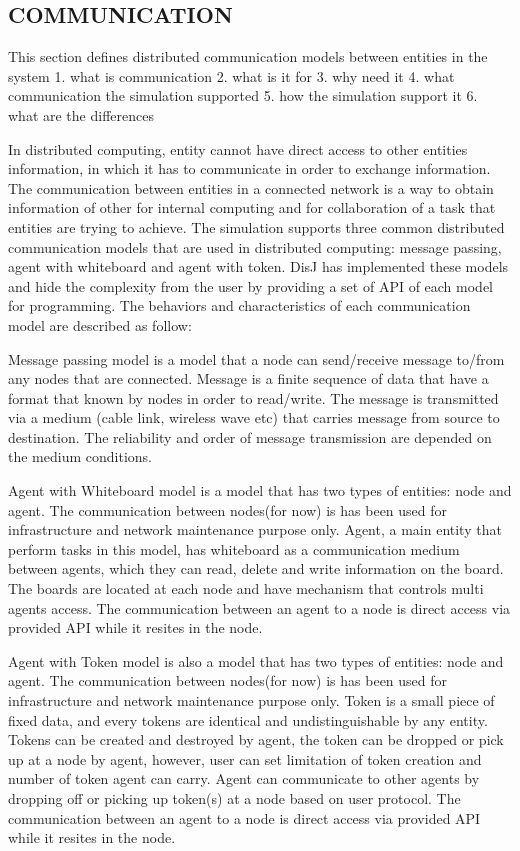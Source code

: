 \subsection{COMMUNICATION}

This section defines distributed communication models between entities in the system
1. what is communication
2. what is it for
3. why need it
4. what communication the simulation supported
5. how the simulation support it
6. what are the differences

In distributed computing, entity cannot have direct access to other entities information, in which it has to communicate in order to exchange information. The communication between entities in a connected network is a way to obtain information of other for internal computing and for collaboration of a task that entities are trying to achieve. The simulation supports three common distributed communication models that are used in distributed computing: message passing, agent with whiteboard and agent with token. DisJ has implemented these models and hide the complexity from the user by providing a set of API of each model for programming. The behaviors and characteristics of each communication model are described as follow:

Message passing model is a model that a node can send/receive message to/from any nodes that are connected. Message is a finite sequence of data that have a format that known by nodes in order to read/write. The message is transmitted via a medium (cable link, wireless wave etc) that carries message from source to destination. The reliability and order of message transmission are depended on the medium conditions.

Agent with Whiteboard model is a model that has two types of entities: node and agent. The communication between nodes(for now) is has been used for infrastructure and network maintenance purpose only. Agent, a main entity that perform tasks in this model, has whiteboard as a communication medium between agents, which they can read, delete and write information on the board. The boards are located at each node and have mechanism that controls multi agents access. The communication between an agent to a node is direct access via provided API while it resites in the node.

Agent with Token model is also a model that has two types of entities: node and agent. The communication between nodes(for now) is has been used for infrastructure and network maintenance purpose only. Token is a small piece of fixed data, and every tokens are identical and undistinguishable by any entity. Tokens can be created and destroyed by agent, the token can be dropped or pick up at a node by agent, however, user can set limitation of token creation and number of token agent can carry. Agent can communicate to other agents by dropping off or picking up token(s) at a node based on user protocol. The communication between an agent to a node is direct access via provided API while it resites in the node.

